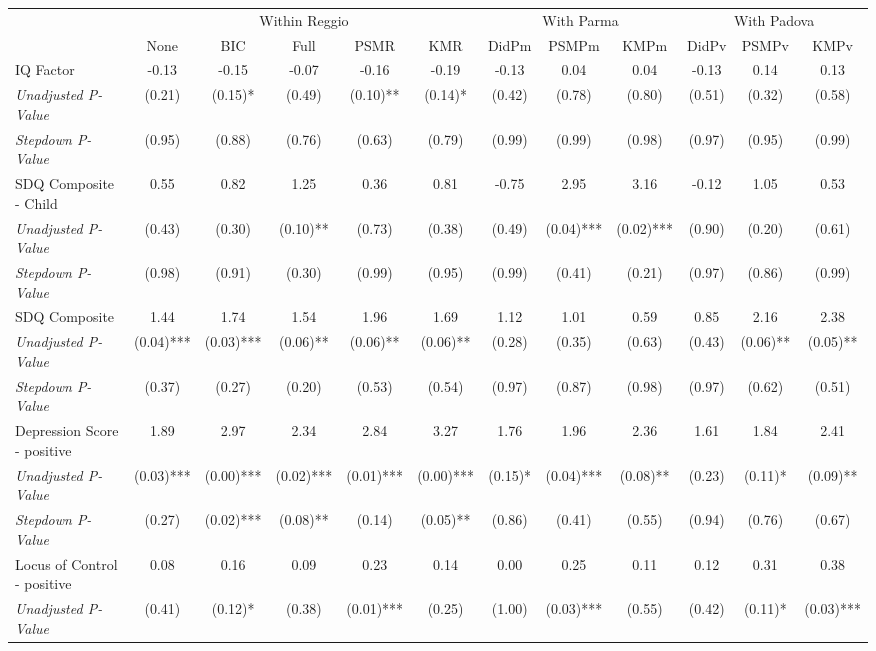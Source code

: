 \begin{tabular}{l c c c c c c c c c c c}
\toprule
& \multicolumn{5}{c}{Within Reggio} & \multicolumn{3}{c}{With Parma} & \multicolumn{3}{c}{With Padova} \\\cmidrule(lr){2-6} \cmidrule(lr){7-9} \cmidrule(lr){10-12}
 & None & BIC & Full & PSMR & KMR & DidPm & PSMPm & KMPm & DidPv & PSMPv & KMPv \\
\midrule
IQ Factor & -0.13 & -0.15 & -0.07 & -0.16 & -0.19 & -0.13 & 0.04 & 0.04 & -0.13 & 0.14 & 0.13 \\
\quad \textit{Unadjusted P-Value} & (0.21) & (0.15)* & (0.49) & (0.10)** & (0.14)* & (0.42) & (0.78) & (0.80) & (0.51) & (0.32) & (0.58) \\
\quad \textit{Stepdown P-Value} & (0.95) & (0.88) & (0.76) & (0.63) & (0.79) & (0.99) & (0.99) & (0.98) & (0.97) & (0.95) & (0.99) \\
SDQ Composite - Child & 0.55 & 0.82 & 1.25 & 0.36 & 0.81 & -0.75 & 2.95 & 3.16 & -0.12 & 1.05 & 0.53 \\
\quad \textit{Unadjusted P-Value} & (0.43) & (0.30) & (0.10)** & (0.73) & (0.38) & (0.49) & (0.04)*** & (0.02)*** & (0.90) & (0.20) & (0.61) \\
\quad \textit{Stepdown P-Value} & (0.98) & (0.91) & (0.30) & (0.99) & (0.95) & (0.99) & (0.41) & (0.21) & (0.97) & (0.86) & (0.99) \\
SDQ Composite & 1.44 & 1.74 & 1.54 & 1.96 & 1.69 & 1.12 & 1.01 & 0.59 & 0.85 & 2.16 & 2.38 \\
\quad \textit{Unadjusted P-Value} & (0.04)*** & (0.03)*** & (0.06)** & (0.06)** & (0.06)** & (0.28) & (0.35) & (0.63) & (0.43) & (0.06)** & (0.05)** \\
\quad \textit{Stepdown P-Value} & (0.37) & (0.27) & (0.20) & (0.53) & (0.54) & (0.97) & (0.87) & (0.98) & (0.97) & (0.62) & (0.51) \\
Depression Score - positive & 1.89 & 2.97 & 2.34 & 2.84 & 3.27 & 1.76 & 1.96 & 2.36 & 1.61 & 1.84 & 2.41 \\
\quad \textit{Unadjusted P-Value} & (0.03)*** & (0.00)*** & (0.02)*** & (0.01)*** & (0.00)*** & (0.15)* & (0.04)*** & (0.08)** & (0.23) & (0.11)* & (0.09)** \\
\quad \textit{Stepdown P-Value} & (0.27) & (0.02)*** & (0.08)** & (0.14) & (0.05)** & (0.86) & (0.41) & (0.55) & (0.94) & (0.76) & (0.67) \\
Locus of Control - positive & 0.08 & 0.16 & 0.09 & 0.23 & 0.14 & 0.00 & 0.25 & 0.11 & 0.12 & 0.31 & 0.38 \\
\quad \textit{Unadjusted P-Value} & (0.41) & (0.12)* & (0.38) & (0.01)*** & (0.25) & (1.00) & (0.03)*** & (0.55) & (0.42) & (0.11)* & (0.03)*** \\

\end{tabular}
